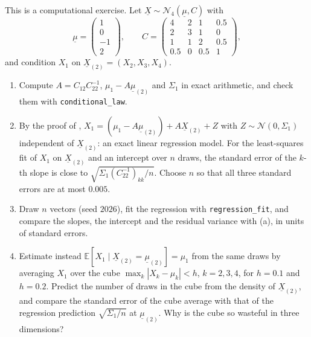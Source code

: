\begin{exercise}\label{ex:gc-regression}
\medium This is a computational exercise. Let $\underline X\sim\mathcal N_4(\underline\mu,C)$ with
\[
  \underline\mu=\begin{pmatrix}1\\0\\-1\\2\end{pmatrix},\qquad
  C=\begin{pmatrix}4&2&1&0.5\\2&3&1&0\\1&1&2&0.5\\0.5&0&0.5&1\end{pmatrix},
\]
and condition $X_1$ on $\underline X_{(2)}=(X_2,X_3,X_4)$.
\begin{enumerate}[label=(\alph*)]
  \item Compute $A=C_{12}C_{22}^{-1}$, $\mu_1-A\underline\mu_{(2)}$ and $\Sigma_1$ in exact arithmetic, and
    check them with \texttt{conditional\_law}.
  \item By the proof of , $X_1=(\mu_1-A\underline\mu_{(2)})+A\underline X_{(2)}+Z$ with
    $Z\sim\mathcal N(0,\Sigma_1)$ independent of $\underline X_{(2)}$: an exact linear regression model. For the
    least-squares fit of $X_1$ on $\underline X_{(2)}$ and an intercept over $n$ draws, the standard error of the
    $k$-th slope is close to $\sqrt{\Sigma_1(C_{22}^{-1})_{kk}/n}$. Choose $n$ so that all three
    standard errors are at most $0.005$.
  \item Draw $n$ vectors (seed $2026$), fit the regression with \texttt{regression\_fit}, and compare
    the slopes, the intercept and the residual variance with (a), in units of standard errors.
  \item Estimate instead $\mathbb E[X_1\mid\underline X_{(2)}=\underline\mu_{(2)}]=\mu_1$ from the same draws by averaging
    $X_1$ over the cube $\max_k|X_k-\mu_k|<h$, $k=2,3,4$, for $h=0.1$ and $h=0.2$. Predict the number of
    draws in the cube from the density of $\underline X_{(2)}$, and compare the standard error of the cube
    average with that of the regression prediction $\sqrt{\Sigma_1/n}$ at $\underline\mu_{(2)}$. Why is the cube so
    wasteful in three dimensions?
\end{enumerate}
\end{exercise}

